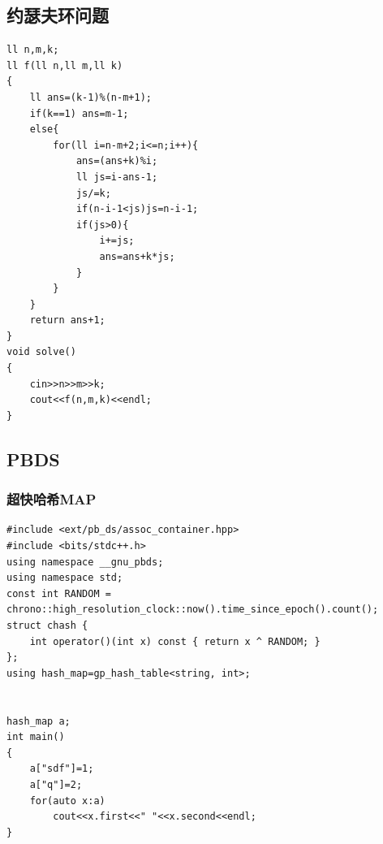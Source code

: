 \documentclass[12pt, a4paper, oneside]{ctexart}
\begin{document}
\newpage
\subsection{约瑟夫环问题} 
\begin{lstlisting}
ll n,m,k;
ll f(ll n,ll m,ll k)
{
	ll ans=(k-1)%(n-m+1);
	if(k==1) ans=m-1;
	else{
		for(ll i=n-m+2;i<=n;i++){
			ans=(ans+k)%i;
			ll js=i-ans-1;
			js/=k;
			if(n-i-1<js)js=n-i-1;
			if(js>0){
				i+=js;
				ans=ans+k*js;
			}
		}
	}
	return ans+1;
}
void solve()
{
	cin>>n>>m>>k;
	cout<<f(n,m,k)<<endl;
}
\end{lstlisting}


\newpage
\subsection{PBDS} 
\subsubsection{超快哈希MAP} 
\begin{lstlisting}
#include <ext/pb_ds/assoc_container.hpp>
#include <bits/stdc++.h>
using namespace __gnu_pbds;
using namespace std;
const int RANDOM = chrono::high_resolution_clock::now().time_since_epoch().count();
struct chash {
    int operator()(int x) const { return x ^ RANDOM; }
};
using hash_map=gp_hash_table<string, int>;


hash_map a;
int main()
{
    a["sdf"]=1;
    a["q"]=2;
    for(auto x:a)
        cout<<x.first<<" "<<x.second<<endl;
}
\end{lstlisting}



\newpage
\end{document}

